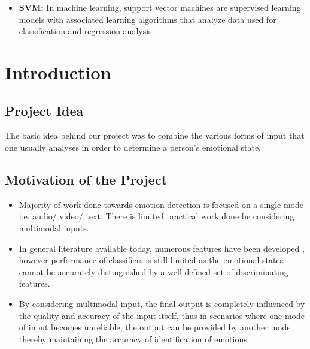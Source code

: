 \documentclass[oneside,a4paper,12pt]{report}
\begin{document}
\begin{normalsize}
\begin{itemize}
 \item \textbf{SVM: } In machine learning, support vector machines are supervised learning models with associated learning algorithms that analyze data used for classification and regression analysis.
 
 \end{itemize}

\chapter{Introduction}
\section{Project Idea}
 The basic idea behind our project was to combine the various forms of input that one usually analyses in order to determine a person's emotional state.

\vspace{\baselineskip}
\section{Motivation of the Project}  
\begin{itemize}
	
\item Majority of work done towards emotion detection is focused on a single mode i.e. audio/ video/ text. There is limited practical work done be considering multimodal inputs.

\item In general literature available today, numerous features have been developed , however performance of classifiers is still limited as the emotional states cannot be accurately distinguished by a well-defined set of discriminating features.

\item By considering multimodal input, the final output is completely influenced by the quality and accuracy of the input itself, thus in scenarios where one mode of input becomes unreliable, the output can be provided by another mode thereby maintaining the accuracy of identification of emotions.

\end{itemize}

\newpage


\end{normalsize}
\end{document}
